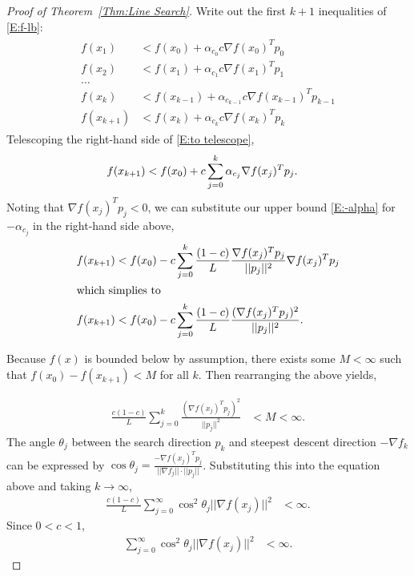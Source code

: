 \documentclass[oneside]{myumnStatThesis}
\begin{document}
\begin{proof}[Proof of Theorem~\ref{Thm:Line Search}]
Write out the first $k+1$ inequalities of \eqref{E:f-lb}:
\begin{align}
\begin{split}
	f( x_1 ) &< f(x_0) + \alpha_{c_0} c \nabla f(x_0)^T p_0 \\
	f( x_2 ) &< f(x_1) + \alpha_{c_1} c \nabla f(x_1)^T p_1  \\
	\ldots  \\
	f( x_{k} ) &< f(x_{k-1}) + \alpha_{c_{k-1}} c \nabla f(x_{k-1})^T p_{k-1}  \\
	f( x_{k+1} ) &< f(x_k) + \alpha_{c_k} c \nabla f(x_k)^T p_k 
\end{split}
	\label{E:to telescope}
\end{align}
Telescoping the right-hand side of \eqref{E:to telescope},
\begin{align*}
	f( x_{k+1} ) &< f(x_0) + c \sum_{j=0}^{k} \alpha_{c_j} \nabla f(x_j)^T p_j. \notag
\end{align*}
Noting that $\nabla f(x_j)^T p_j < 0$, we can substitute our upper bound \eqref{E:-alpha} for $-\alpha_{c_j}$ in the 
right-hand side above,
\begin{align}
	f( x_{k+1} ) &< f(x_0) - c \sum_{j=0}^{k} \frac{( 1 - c )}{L} \frac{ \nabla f(x_j)^T p_j}{ || p_j ||^2 } \nabla f
(x_j)^T p_j \notag \\
	\intertext{which simplies to}
	f( x_{k+1} ) &< f(x_0) - c \sum_{j=0}^{k} \frac{( 1 - c )}{L} \frac{ (\nabla f(x_j)^T p_j)^2}{ || p_j ||^2 }. 
\notag
\end{align}

Because $f(x)$ is bounded below by assumption, there exists some $M < \infty$ such that $f(x_0) - f(x_{k+1}) < M$ for 
all $k$. Then rearranging the above yields,

\begin{align*}
	\frac{c( 1 - c )}{L} \sum_{j=0}^{k}   \frac{ ( \nabla f(x_j)^T p_j )^2}{ || p_j ||^2 } &< M < \infty.
 \end{align*}
The angle $\theta_j$ between the search direction $p_k$ and steepest descent direction $-\nabla f_k$ can be expressed 
by $\cos \theta_j = \frac{ -\nabla f(x_j)^T p_j}{||\nabla f_j|| \cdot || p_j||}$.  Substituting this into the equation 
above and taking $k \to \infty$,
\begin{align*}
	\frac{c( 1 - c )}{L} \sum_{j=0}^{\infty}  \cos^2 \theta_j ||\nabla f(x_j)||^2 &< \infty.
\end{align*}
Since $0 < c < 1$,
\begin{align}
	\sum_{j=0}^{\infty}  \cos^2 \theta_j ||\nabla f(x_j)||^2 &< \infty. \label{E:Z's}
\end{align}


\end{proof}
\end{document}
